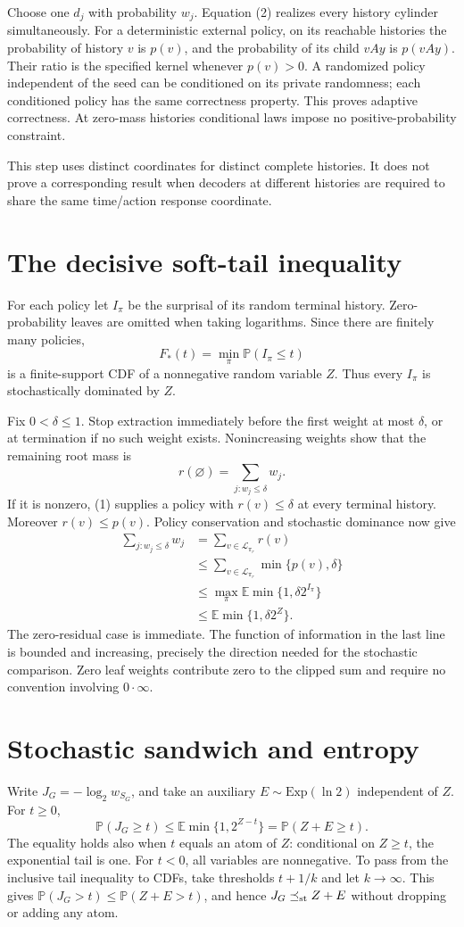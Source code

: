 \documentclass[11pt,a4paper]{article}
\newcommand{\E}{\mathbb E}
\newcommand{\Prob}{\mathbb P}
\begin{document}
Choose one $d_j$ with probability $w_j$. Equation (2) realizes every history
cylinder simultaneously. For a deterministic external policy, on its
reachable histories the probability of history $v$ is $p(v)$, and the
probability of its child $vAy$ is $p(vAy)$. Their ratio is the specified
kernel whenever $p(v)>0$. A randomized policy independent of the seed can
be conditioned on its private randomness; each conditioned policy has the
same correctness property. This proves adaptive correctness. At zero-mass
histories conditional laws impose no positive-probability constraint.

This step uses distinct coordinates for distinct complete histories. It
does not prove a corresponding result when decoders at different histories
are required to share the same time/action response coordinate.

\section{The decisive soft-tail inequality}
For each policy let $I_\pi$ be the surprisal of its random terminal history.
Zero-probability leaves are omitted when taking logarithms. Since there
are finitely many policies,
\[
F_*(t)=\min_\pi\Prob(I_\pi\le t)
\]
is a finite-support CDF of a nonnegative random variable $Z$. Thus every
$I_\pi$ is stochastically dominated by $Z$.

Fix $0<\delta\le1$. Stop extraction immediately before the first weight
at most $\delta$, or at termination if no such weight exists. Nonincreasing
weights show that the remaining root mass is
\[
r(\varnothing)=\sum_{j:w_j\le\delta}w_j.
\]
If it is nonzero, (1) supplies a policy with $r(v)\le\delta$ at every
terminal history. Moreover $r(v)\le p(v)$. Policy conservation and stochastic
dominance now give
\begin{align*}
\sum_{j:w_j\le\delta}w_j
&=\sum_{v\in\mathcal L_{\pi_r}}r(v)\\
&\le\sum_{v\in\mathcal L_{\pi_r}}\min\{p(v),\delta\}\\
&\le\max_\pi\E\min\{1,\delta2^{I_\pi}\}\\
&\le\E\min\{1,\delta2^Z\}.
\end{align*}
The zero-residual case is immediate. The function of information in the
last line is bounded and increasing, precisely the direction needed for
the stochastic comparison. Zero leaf weights contribute zero to the
clipped sum and require no convention involving $0\cdot\infty$.

\section{Stochastic sandwich and entropy}
Write $J_G=-\log_2 w_{S_G}$, and take an auxiliary
$E\sim\mathrm{Exp}(\ln2)$ independent of $Z$. For $t\ge0$,
\[
\Prob(J_G\ge t)
\le\E\min\{1,2^{Z-t}\}
=\Prob(Z+E\ge t).
\tag{3}
\]
The equality holds also when $t$ equals an atom of $Z$: conditional on
$Z\ge t$, the exponential tail is one. For $t<0$, all variables are
nonnegative. To pass from the inclusive tail inequality to CDFs, take
thresholds $t+1/k$ and let $k\to\infty$. This gives
$\Prob(J_G>t)\le\Prob(Z+E>t)$, and hence
$J_G\preceq_{\rm st}Z+E$ without dropping or adding any atom.
\end{document}
